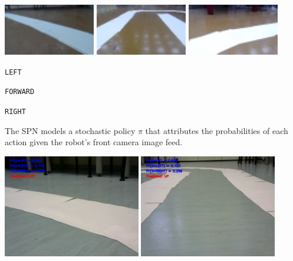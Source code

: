 \documentclass[a0paper,portrait]{baposter}
\begin{document}
\begin{poster}
{\begin{center}
\begin{minipage}[t][8.25cm]{0.98\textwidth}
      \begin{center}
        \includegraphics[width=0.3\textwidth]{sample_left.png}
        \includegraphics[width=0.3\textwidth]{sample_up.png}
        \includegraphics[width=0.3\textwidth]{sample_right.png}
        \begin{minipage}{0.3\textwidth}
          \centering\texttt{LEFT}
        \end{minipage}
        \begin{minipage}{0.3\textwidth}
          \centering\texttt{FORWARD}
        \end{minipage}
        \begin{minipage}{0.3\textwidth}
          \centering\texttt{RIGHT}
        \end{minipage}
      \end{center}

      The SPN models a stochastic policy $\pi$ that attributes the probabilities of each action given
      the robot's front camera image feed.

      \vspace{-0.1cm}
      \begin{center}
        \includegraphics[width=0.45\textwidth]{demo_0041_shaved.png}
        \includegraphics[width=0.45\textwidth]{demo_0043_shaved.png}
      \end{center}
      \vspace{-0.2cm}


\end{minipage}
\end{center}}
\end{poster}
\end{document}
